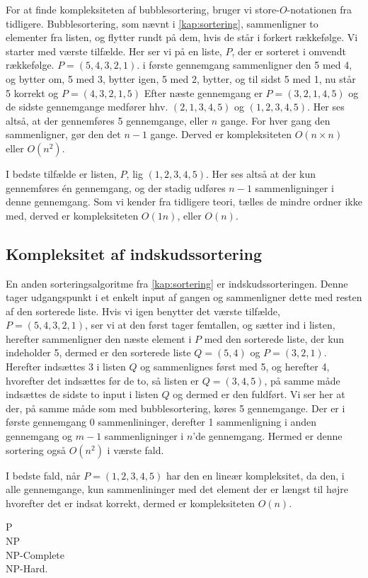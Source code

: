 For at finde kompleksiteten af bubblesortering, bruger vi store-$O$-notationen fra tidligere. 
Bubblesortering, som nævnt i \autoref{kap:sortering}, sammenligner to elementer fra listen, og flytter rundt på dem, hvis de står i forkert rækkefølge.
Vi starter med værste tilfælde. Her ser vi på en liste, $P$, der er sorteret i omvendt rækkefølge. $P = (5,4,3,2,1)$.
i første gennemgang sammenligner den 5 med 4, og bytter om, 5 med 3, bytter igen, 5 med 2, bytter, og til sidst 5 med 1, nu står 5 korrekt og $P = (4, 3, 2, 1, 5)$
Efter næste gennemgang er $P = (3, 2, 1, 4, 5)$ og de sidste gennemgange medfører hhv. $(2, 1, 3, 4, 5)$ og $(1, 2, 3, 4, 5)$. Her ses altså, at der gennemføres 5 gennemgange, eller $n$ gange. 
For hver gang den sammenligner, gør den det $n-1$ gange. 
Derved er kompleksiteten $O(n\times n)$ eller $O(n^2)$.

I bedste tilfælde er listen, $P$, lig $(1, 2, 3, 4, 5)$.
Her ses altså at der kun gennemføres én gennemgang, og der stadig udføres $n-1$ sammenligninger i denne gennemgang.
Som vi kender fra tidligere teori, tælles de mindre ordner ikke med, derved er kompleksiteten $O(1n)$, eller $O(n)$. 

\subsection{Kompleksitet af indskudssortering} \label{kap:kom_indskud}
En anden sorteringsalgoritme fra \autoref{kap:sortering} er indskudssorteringen. 
Denne tager udgangspunkt i et enkelt input af gangen og sammenligner dette med resten af den sorterede liste.
Hvis vi igen benytter det værste tilfælde, $P = (5,4,3,2,1)$, ser vi at den først tager femtallen, og sætter ind i listen, herefter sammenligner den næste element i $P$ med den sorterede liste, der kun indeholder 5, dermed er den sorterede liste $Q = (5,4)$ og $P=(3,2,1)$. 
Herefter indsættes 3 i listen $Q$ og sammenlignes først med 5, og herefter 4, hvorefter det indsættes før de to, så listen er $Q = (3,4,5)$, på samme måde indsættes de sidste to input i listen $Q$ og dermed er den fuldført.
Vi ser her at der, på samme måde som med bubblesortering, køres 5 gennemgange. Der er i første gennemgang 0 sammenlininger, derefter 1 sammenligning i anden gennemgang og $m-1$ sammenligninger i $n$'de gennemgang. Hermed er denne sortering også $O(n^2)$ i værste fald.

I bedste fald, når $P= (1,2,3,4,5)$ har den en lineær kompleksitet, da den, i alle gennemgange, kun sammenlininger med det element der er længst til højre hvorefter det er indsat korrekt, dermed er kompleksiteten $O(n)$.



P \\
NP \\
NP-Complete \\
NP-Hard. 


